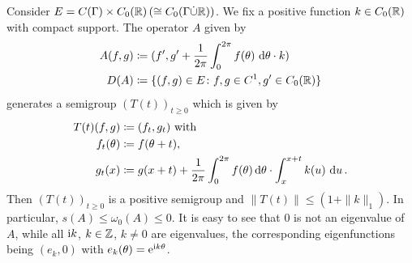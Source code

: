 \begin{example}\label{ex:b3-2.13}
%
	Consider $E = C(\Gamma) \times C_{0}(\mathbb{R}) \, (\cong C_{0}(\Gamma\dot{\cup}\mathbb{R}))$.
	We fix a positive function $k \in C_{0}(\mathbb{R})$ with compact support.
	The operator $A$ given by
	\begin{equation}\label{eq:b3-2.20}
		\begin{aligned}
		A(f,g) &\coloneqq (f',g' + \frac{1}{2\pi}\int_{0}^{2\pi} f(\theta) \, \mathop{}\!\mathrm{d}{\theta}\cdot k) \\
		D(A) &\coloneqq \{(f,g) \in E \colon f,g \in C^{1}, g' \in C_{0}(\mathbb{R})\}
		\end{aligned}
	\end{equation}
	generates a semigroup $(T(t))_{t \geq 0}$ which is given by
	\begin{equation}\label{eq:b3-2.21}
		\begin{aligned}
			T(t)(f,g) &\coloneq (f_{t},g_{t}) \text{ with }\\
		   f_{t}(\theta) &\coloneqq f(\theta+t), \\
			g_{t}(x) &\coloneqq g(x+t) + \frac{1}{2\pi}\int_{0}^{2\pi} f(\theta) \mathop{}\!\mathrm{d}{\theta}\cdot\int_{x}^{x+t} k(u) \, \mathop{}\!\mathrm{d}{u} \,.
		\end{aligned} 
	\end{equation}
	Then $(T(t))_{t \geq 0}$ is a positive semigroup and $\|T(t)\| \leq (1 + \|k\|_{1})$.
	In particular, $s(A) \leq \omega_{0}(A) \leq 0$.
	It is easy to see that $0$ is not an eigenvalue of $A$, while all $\mathrm{i} k$, $k \in \mathbb{Z}$, $k \neq 0$ are eigenvalues, the corresponding eigenfunctions being $(e_{k},0)$ with $e_{k}(\theta) = \mathrm{e}^{\mathrm{i} k\theta}$.
\end{example}
